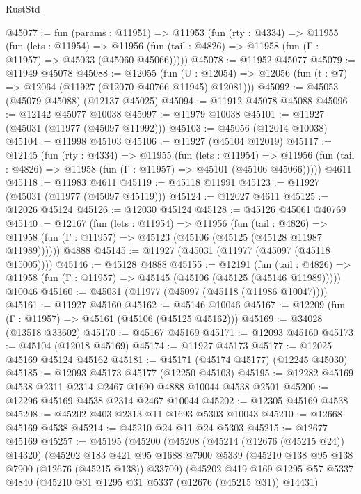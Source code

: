 \begin{lexlean}{RustStd}
\begin{coremodule}
@45077 := fun (params : @11951) =>
  @11953
    (fun (rty : @4334) =>
    @11955
      (fun (lets : @11954) =>
      @11956 (fun (tail : @4826) => @11958 (fun (Γ : @11957) => @45033 (@45060 @45066)))))
@45078 := @11952 @45077
@45079 := @11949 @45078
@45088 := @12055
    (fun (U : @12054) => @12056 (fun (t : @7) => @12064 (@11927 (@12070 @40766 @11945) @12081)))
@45092 := @45053 (@45079 @45088) (@12137 @45025)
@45094 := @11912 @45078 @45088
@45096 := @12142 @45077 @10038
@45097 := @11979 @10038
@45101 := @11927 (@45031 (@11977 (@45097 @11992)))
@45103 := @45056 (@12014 @10038)
@45104 := @11998 @45103
@45106 := @11927 (@45104 @12019)
@45117 := @12145
    (fun (rty : @4334) =>
    @11955
      (fun (lets : @11954) =>
      @11956 (fun (tail : @4826) => @11958 (fun (Γ : @11957) => @45101 (@45106 @45066)))))
    @4611
@45118 := @11983 @4611
@45119 := @45118 @11991
@45123 := @11927 (@45031 (@11977 (@45097 @45119)))
@45124 := @12027 @4611
@45125 := @12026 @45124
@45126 := @12030 @45124
@45128 := @45126 @45061 @40769
@45140 := @12167
    (fun (lets : @11954) =>
    @11956
      (fun (tail : @4826) =>
      @11958 (fun (Γ : @11957) => @45123 (@45106 (@45125 (@45128 @11987 @11989))))))
    @4888
@45145 := @11927 (@45031 (@11977 (@45097 (@45118 @15005))))
@45146 := @45128 @4888
@45155 := @12191
    (fun (tail : @4826) => @11958 (fun (Γ : @11957) => @45145 (@45106 (@45125 (@45146 @11989)))))
    @10046
@45160 := @45031 (@11977 (@45097 (@45118 (@11986 @10047))))
@45161 := @11927 @45160
@45162 := @45146 @10046
@45167 := @12209 (fun (Γ : @11957) => @45161 (@45106 (@45125 @45162)))
@45169 := @34028 (@13518 @33602)
@45170 := @45167 @45169
@45171 := @12093 @45160
@45173 := @45104 (@12018 @45169)
@45174 := @11927 @45173
@45177 := @12025 @45169 @45124 @45162
@45181 := @45171 (@45174 @45177) (@12245 @45030)
@45185 := @12093 @45173 @45177 (@12250 @45103)
@45195 := @12282 @45169 @4538 @2311 @2314 @2467 @1690 @4888 @10044 @4538 @2501
@45200 := @12296 @45169 @4538 @2314 @2467 @10044
@45202 := @12305 @45169 @4538
@45208 := @45202 @403 @2313 @11 @1693 @5303 @10043
@45210 := @12668 @45169 @4538
@45214 := @45210 @24 @11 @24 @5303
@45215 := @12677 @45169
@45257 := @45195
    (@45200
      (@45208
        (@45214 (@12676 (@45215 @24)) @14320)
        (@45202
          @183
          @421
          @95
          @1688
          @7900
          @5339
          (@45210 @138 @95 @138 @7900 (@12676 (@45215 @138)) @33709)
          (@45202
            @419
            @169
            @1295
            @57
            @5337
            @4840
            (@45210 @31 @1295 @31 @5337 (@12676 (@45215 @31)) @14431)

\end{coremodule}
\end{lexlean}
